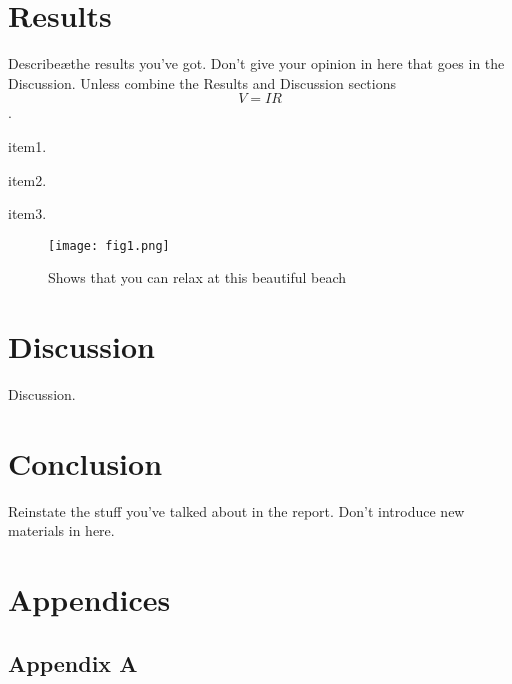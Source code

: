 \documentclass[a4paper, 12pt]{article}
\newcounter{foo}
\begin{document}
\section{Results}\label{sec:res}
    Describe\ae the results you've got. Don't give your opinion in here that goes in the Discussion.
    Unless combine the Results and Discussion sections \begin{equation} V = IR\end{equation}.

    \begin{list}{S-}{}
        \item item1.
        
        \item item2.
        
        \item item3.
    \end{list}

    \begin{figure}[h]
        \centering
        \graphicspath{{./wiki/}}
        \texttt{[image: fig1.png]}
        \caption{Shows that you can relax at this beautiful beach}
        \label{Fig:my_label}
    \end{figure}

\section{Discussion}\label{sec:dis}
    Discussion.

\section{Conclusion}\label{sec:conc}
    Reinstate the stuff you've talked about in the report. Don't introduce new materials in here.

\pagebreak

\renewcommand{\bibname}{References}
\renewcommand{\bibsection}{\section{\bibname}}
\renewcommand{\cite}{\citep}

\pagebreak

\section{Appendices}
    \subsection{Appendix A}
\end{document}
